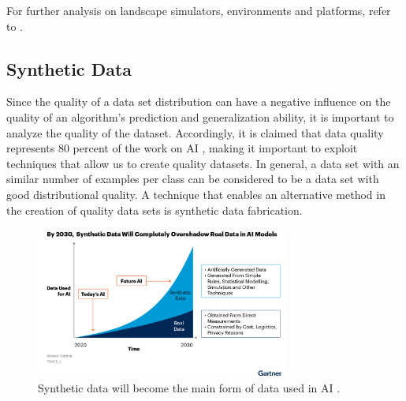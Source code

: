 
For further analysis on landscape simulators, environments and platforms, refer to \cite{collins2021review, juliani2018unity}. 


\subsection{Synthetic Data}\label{chap2:synthetic-data}
Since the quality of a data set distribution can have a negative influence on the quality of an algorithm's prediction and generalization ability, it is important to analyze the quality of the dataset. 
Accordingly, it is claimed that data quality represents 80 percent of the work on AI \cite{8_andrews_2021}, making it important to exploit techniques that allow us to create quality datasets. In general, a data set with an similar number of examples per class can be considered to be a data set with good distributional quality.
A technique that enables an alternative method in the creation of quality data sets is synthetic data fabrication.
% 
% 
% 
\begin{figure}[!ht]
    \centering
    \includegraphics[width=0.75\textwidth]{images/synthetic-gartner.jpg}
    \caption{Synthetic data will become the main form of data used in AI \cite{gartner_inc2021synthetic}.
    }
    \label{fig:synthetic-data}
\end{figure}
    
